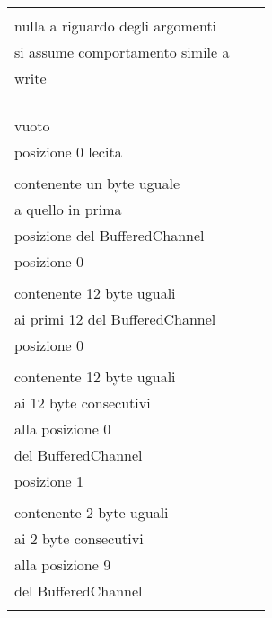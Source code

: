 \documentclass[10pt, a4paper]{article}
\newcommand{\Intmaketable}[4]{
	\begin{longtable}{#3}
	#4
	\caption{#2}
	\label{#1}
	\end{longtable}
}
\newcommand{\Inttestctable}[3]{
	\Intmaketable{#1}{#2}{|l|l|l|}{
	\hline
	\thead{Input} & \thead{Esito atteso} & \thead{Motivazione}\\
	\hline
	\hline
	#3
	\hline}
}
\newcommand{\Inttestccaption}[4]{Casi di test per metodo #1 di #2, iter. #3 (#4)}
\newcommand{\gettablelabel}[5]{table:#1:#2:#3:iter#4:proj#5}
\newcommand{\testctable}[5]{
	\Inttestctable{\gettablelabel{testc}{#1}{#2}{#3}{#4}}
		{\Inttestccaption{#1}{#2}{#3}{#4}}
		{#5}
}
\newcommand{\tcell}{\makecell[tl]}
\newcommand{\newtrow}{\\ \hline}
\def\bookkeeper{BookKeeper}
\begin{document}
	\testctable{read}{BufferedChannel}{1}{\bookkeeper}{
			\tcell{null, 0, 0} & 
			\tcell{NullPointerException viene lanciata} & 
			\tcell{
				La documentazione non specifica\\
				nulla a riguardo degli argomenti\\
				si assume comportamento simile a\\
				write} 
		\newtrow
			\tcell{ByteBuf(), -1, -1} & 
			\tcell{IllegalArgumentException viene lanciata} & 
			\tcell{pos e length non possono essere $<$ 0}	
		\newtrow
			\tcell{ByteBuf(), -1, 0} & 
			\tcell{IllegalArgumentException viene lanciata} & 
			\tcell{pos non può essere $<$ 0}
		\newtrow
			\tcell{ByteBuf(), 0, -1} & 
			\tcell{IllegalArgumentException viene lanciata} & 
			\tcell{length non può essere $<$ 0}
		\newtrow
			\tcell{ByteBuf(), 0, 0} & 
			\tcell{
				Buffer destinazione\\ 
				vuoto} & 
			\tcell{
				Lettura di 0 byte dalla\\
				posizione 0 lecita}
		\newtrow
			\tcell{ByteBuf(), 0, 1} & 
			\tcell{
				Buffer destinazione\\ 
				contenente un byte uguale\\ 
				a quello in prima\\ 
				posizione del BufferedChannel} & 
			 \tcell{
			 	Lettura di 1 byte dalla\\
			 	posizione 0}
		\newtrow
			\tcell{ByteBuf(), 0, 12} & 
			\tcell{
				Buffer destinazione\\ 
				contenente 12 byte uguali\\ 
				ai primi 12 del BufferedChannel} & 
			\tcell{
				Lettura di 12 byte dalla\\
				posizione 0}
		\newtrow
			\tcell{ByteBuf(), 1, 12} & 
			\tcell{
				Buffer destinazione\\ 
				contenente 12 byte uguali\\ 
				ai 12 byte consecutivi\\
				alla posizione 0\\ 
				del BufferedChannel} & 
			\tcell{
				Lettura di 12 byte dalla\\
				posizione 1}
		\newtrow
			\tcell{ByteBuf(), 10, 2} & 
			\tcell{
				Buffer destinazione\\ 
				contenente 2 byte uguali\\ 
				ai 2 byte consecutivi\\
				alla posizione 9\\ 
				del BufferedChannel} & 
			\tcell{
				Lettura di 2 byte dalla\\
}}
\end{document}
